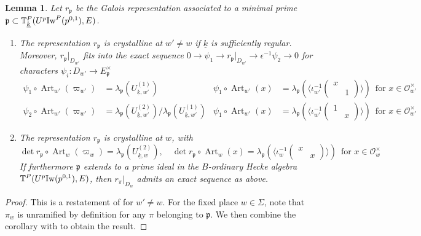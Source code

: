 \documentclass[leqno]{amsart}
\newtheorem{lem}[thm]{Lemma}
\theoremstyle{definition}
\theoremstyle{remark}
\newcommand{\oo}{\mathcal{O}}
\DeclareMathOperator{\Art}{Art}
\newcommand{\fp}{\mathfrak{p}}
\newcommand{\wt}[1]{\underline{ #1 }}
\newcommand{\Iw}{\textnormal{Iw}} %
\newcommand{\TT}{\mathbb{T}} %
\begin{document}
\begin{lem}\label{lem:galois_at_p}
	Let $r_{\fp}$ be the Galois representation
	associated to a minimal prime
	$\fp\subset \TT^P_{\wt{k}}(U^p\Iw^P(p^{0,1}),E)$.
	\begin{enumerate}[label=(\alph*)]
	\item The representation $r_\fp$ is crystalline at $w'\neq w$
	if $\wt{k}$ is sufficiently regular.
	Moreover, $r_\fp\vert_{D_{w'}}$ 
	fits into the exact sequence
	$0\to \psi_1\to r_{\fp}\vert_{D_{w'}} \to \epsilon^{-1}\psi_2\to 0$
	for characters $\psi_i\colon D_{w'}\to E_{\fp}^{\times}$
	\begin{equation}\label{eq:Gal_hecke_at_p}
	\begin{aligned}
		\psi_1\circ \Art_{w'}(\varpi_{w'})&=
		\lambda_{\fp}(U_{\wt{k},w'}^{(1)}) &
		\psi_1\circ \Art_{w'}(x)&=
		\lambda_{\fp}
		(\langle 
		\iota_{w'}^{-1}
		(\begin{smallmatrix}
			x&\\&1
		\end{smallmatrix})
		\rangle)\, \text{ for }x\in \oo_{w'}^{\times}\\
		\psi_2\circ \Art_{w'}(\varpi_{w'})&=
		\lambda_{\fp}(U_{\wt{k},w'}^{(2)})/
		\lambda_{\fp}(U_{\wt{k},w'}^{(1)}) &
		\psi_1\circ \Art_{w'}(x)&=
		\lambda_{\fp}
		(\langle 
		\iota_{w'}^{-1}
		(\begin{smallmatrix}
			1&\\&x
		\end{smallmatrix})
		\rangle)\, \text{ for }x\in \oo_{w'}^{\times}
	\end{aligned}
	\end{equation}
	\item The representation $r_\fp$ is 
	crystalline at $w$, with 
	\[
	\det r_\fp\circ \Art_w(\varpi_w)=
	\lambda_{\fp}(U_{\wt{k},w}^{(2)}),\quad
	\det r_\fp\circ \Art_w(x)=
	\lambda_{\fp}
	(\langle 
	\iota_{w}^{-1}
	(\begin{smallmatrix}
		x&\\&x
	\end{smallmatrix})
	\rangle)\, \text{ for }x\in \oo_{w}^{\times}
	\]
	If furthermore $\fp$ extends
	to a prime ideal in the $B$-ordinary Hecke algebra
	$\TT^P(U^p\Iw(p^{0,1}),E)$,
	then $r_\pi\vert_{D_w}$ 
	admits an exact sequence as above.
	\end{enumerate}
\end{lem}
\begin{proof}
This is a restatement of \cite[Cor 2.33]{ger}
for $w'\neq w$.
For the fixed place  $w\in \Sigma$,
note that $\pi_w$ is unramified 
by definition
for any $\pi$ belonging to $\fp$.
We then combine the corollary with \cite[Lem 2.31]{ger} to obtain 
the result.
\end{proof}
\end{document}
